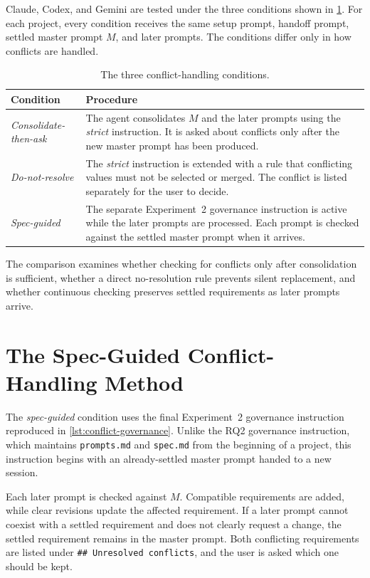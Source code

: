 Claude, Codex, and Gemini are tested under the three conditions shown in
\cref{tab:conflict-conditions}. For each project, every condition receives the
same setup prompt, handoff prompt, settled master prompt \(M\), and later
prompts. The conditions differ only in how conflicts are handled.

\begin{table}[htbp]
  \centering
  \caption{The three conflict-handling conditions.}
  \label{tab:conflict-conditions}
  \begin{tabular}{@{}lp{9cm}@{}}
    \toprule
    Condition & Procedure \\
    \midrule
    \emph{Consolidate-then-ask} & The agent consolidates \(M\) and the later prompts using the \emph{strict} instruction. It is asked about conflicts only after the new master prompt has been produced. \\
    \emph{Do-not-resolve} & The \emph{strict} instruction is extended with a rule that conflicting values must not be selected or merged. The conflict is listed separately for the user to decide. \\
    \emph{Spec-guided} & The separate Experiment~2 governance instruction is active while the later prompts are processed. Each prompt is checked against the settled master prompt when it arrives. \\
    \bottomrule
  \end{tabular}
\end{table}

The comparison examines whether checking for conflicts only after
consolidation is sufficient, whether a direct no-resolution rule prevents
silent replacement, and whether continuous checking preserves settled
requirements as later prompts arrive.

\section{The Spec-Guided Conflict-Handling Method}
\label{sec:conflict-detector}

The \emph{spec-guided} condition uses the final Experiment~2 governance
instruction reproduced in \cref{lst:conflict-governance}. Unlike the RQ2
governance instruction, which maintains \texttt{prompts.md} and
\texttt{spec.md} from the beginning of a project, this instruction begins
with an already-settled master prompt handed to a new session.

Each later prompt is checked against \(M\). Compatible requirements are added,
while clear revisions update the affected requirement. If a later prompt
cannot coexist with a settled requirement and does not clearly request a
change, the settled requirement remains in the master prompt. Both conflicting
requirements are listed under \texttt{\#\# Unresolved conflicts}, and the user
is asked which one should be kept.


